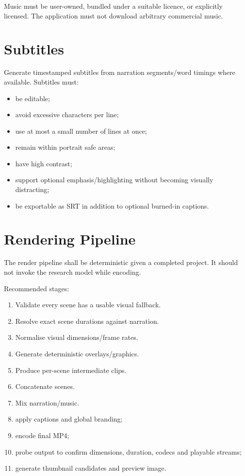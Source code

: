 \documentclass[10pt,journal,compsoc]{IEEEtran}
\begin{document}
Music must be user-owned, bundled under a suitable licence, or explicitly licensed. The application must not download arbitrary commercial music.

\section{Subtitles}

Generate timestamped subtitles from narration segments/word timings where available. Subtitles must:
\begin{itemize}
    \item be editable;
    \item avoid excessive characters per line;
    \item use at most a small number of lines at once;
    \item remain within portrait safe areas;
    \item have high contrast;
    \item support optional emphasis/highlighting without becoming visually distracting;
    \item be exportable as SRT in addition to optional burned-in captions.
\end{itemize}

\section{Rendering Pipeline}

The render pipeline shall be deterministic given a completed project. It should not invoke the research model while encoding.

Recommended stages:
\begin{enumerate}
    \item Validate every scene has a usable visual fallback.
    \item Resolve exact scene durations against narration.
    \item Normalise visual dimensions/frame rates.
    \item Generate deterministic overlays/graphics.
    \item Produce per-scene intermediate clips.
    \item Concatenate scenes.
    \item Mix narration/music.
    \item apply captions and global branding;
    \item encode final MP4;
    \item probe output to confirm dimensions, duration, codecs and playable streams;
    \item generate thumbnail candidates and preview image.
\end{enumerate}
\end{document}
